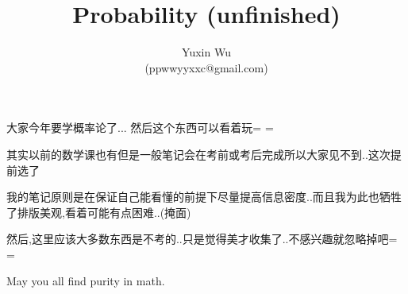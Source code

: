 \documentclass[a4paper]{article}
\title{Probability (unfinished)}
\author{Yuxin Wu\\(ppwwyyxxc@gmail.com)}
\date{}
\begin{document}
\maketitle
大家今年要学概率论了...
然后这个东西可以看着玩= =

其实以前的数学课也有但是一般笔记会在考前或考后完成所以大家见不到..这次提前选了

我的笔记原则是在保证自己能看懂的前提下尽量提高信息密度..而且我为此也牺牲了排版美观,看着可能有点困难..(掩面)

然后,这里应该大多数东西是不考的..只是觉得美才收集了..不感兴趣就忽略掉吧= =

May you all find purity in math.
\tableofcontents

\setlength{\baselineskip}{1.5em}








\end{document}

